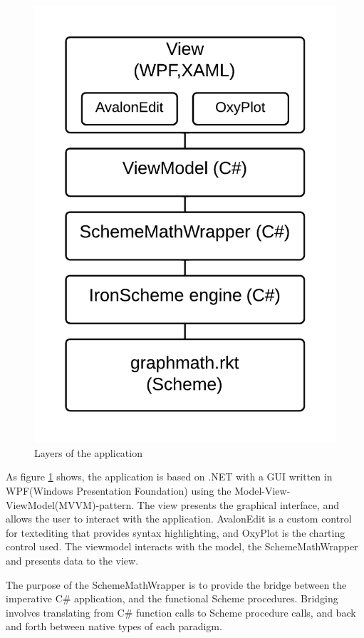 \documentclass[a4paper,12pt]{article}
\begin{document}
\begin{figure}[h]
	\centering
	\includegraphics[scale=0.23]{MultiParadigmeBlocks}
	\caption{Layers of the application}
    \label{fig:layers}
\end{figure}

As figure \ref{fig:layers} shows, the application is based on .NET with a GUI written in WPF(Windows Presentation Foundation) using the Model-View-ViewModel(MVVM)-pattern. The view presents the graphical interface, and allows the user to interact with the application. AvalonEdit is a custom control for textediting that provides syntax highlighting, and OxyPlot is the charting control used. The viewmodel interacts with the model, the SchemeMathWrapper and presents data to the view.
 
The purpose of the SchemeMathWrapper is to provide the bridge between the imperative C\# application, and the functional Scheme procedures. Bridging involves translating from C\# function calls to Scheme procedure calls, and back and forth between native types of each paradigm.
\end{document}
